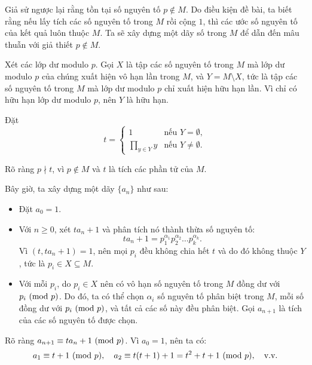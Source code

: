 \documentclass[../09-contruction-methods.tex]{subfiles}
\begin{document}
\begin{soln}\footnotemark
    Giả sử ngược lại rằng tồn tại số nguyên tố \( p \notin M \).  
    Do điều kiện đề bài, ta biết rằng nếu lấy tích các số nguyên tố trong \( M \) rồi cộng \( 1 \), thì các ước số nguyên tố của kết quả luôn thuộc \( M \).  
    Ta sẽ xây dựng một dãy số trong \( M \) để dẫn đến mâu thuẫn với giả thiết \( p \notin M \).
    
    Xét các lớp dư modulo \( p \). Gọi \( X \) là tập các số nguyên tố trong \( M \) mà lớp dư modulo \( p \) của chúng xuất hiện vô hạn lần trong \( M \),  
    và \( Y = M \setminus X \), tức là tập các số nguyên tố trong \( M \) mà lớp dư modulo \( p \) chỉ xuất hiện hữu hạn lần.  
    Vì chỉ có hữu hạn lớp dư modulo \( p \), nên \( Y \) là hữu hạn.
    
    Đặt 
    \[
    t = 
    \begin{cases}
        1 & \text{nếu } Y = \emptyset, \\
        \prod\limits_{y \in Y} y & \text{nếu } Y \neq \emptyset.
    \end{cases}
    \]
    
    Rõ ràng \( p \nmid t \), vì \( p \notin M \) và \( t \) là tích các phần tử của \( M \).
    
    Bây giờ, ta xây dựng một dãy \( \{a_n\} \) như sau:
    
    \begin{itemize}[topsep=0pt, partopsep=0pt, itemsep=0pt]
        \item Đặt \( a_0 = 1 \).
        \item Với \( n \ge 0 \), xét \( ta_n + 1 \) và phân tích nó thành thừa số nguyên tố:
      	\[
      		ta_n + 1 = p_1^{\alpha_1} p_2^{\alpha_2} \ldots p_k^{\alpha_k}.
      	\]
    	Vì \( (t, ta_n + 1) = 1 \), nên mọi \( p_i \) đều không chia hết \( t \) và do đó không thuộc \( Y \), tức là \( p_i \in X \subseteq M \).
    	\item Với mỗi \( p_i \), do \( p_i \in X \) nên có vô hạn số nguyên tố trong \( M \) đồng dư với \( p_i \ (\mathrm{mod}\ p) \).
    	Do đó, ta có thể chọn \( \alpha_i \) số nguyên tố phân biệt trong \( M \), mỗi số đồng dư với \( p_i \ (\mathrm{mod}\ p) \), và tất cả các số này đều phân biệt.  
    	Gọi \( a_{n+1} \) là tích của các số nguyên tố được chọn.
    \end{itemize}
    
    Rõ ràng \( a_{n+1} \equiv ta_n + 1 \ (\mathrm{mod}\ p) \). Vì \( a_0 = 1 \), nên ta có:
    \[
    	a_1 \equiv t + 1 \ (\mathrm{mod}\ p), \quad a_2 \equiv t(t + 1) + 1 = t^2 + t + 1 \ (\mathrm{mod}\ p), \quad \text{v.v.}
    \]
    

\end{soln}
\end{document}
